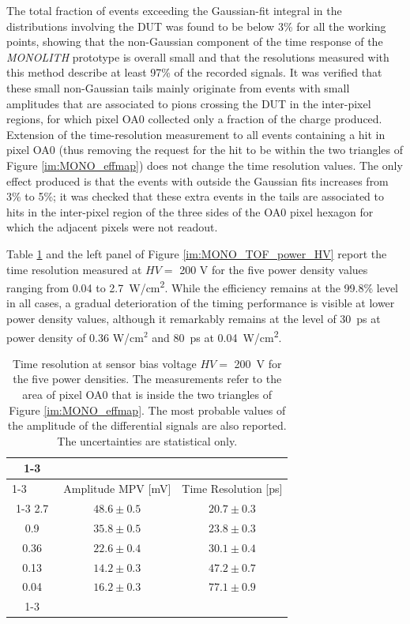 		The total fraction of events exceeding the Gaussian-fit integral in the \dtoa distributions involving the DUT was found to be below 3\% for all the working points, showing that the non-Gaussian component of the time response of the \textit{MONOLITH} prototype is overall small and that the resolutions measured with this method describe at least 97\% of the recorded signals. 
		It was verified that these small non-Gaussian tails mainly originate from events with small amplitudes that are associated to pions crossing the DUT in the inter-pixel regions, for which pixel OA0 collected only a fraction of the charge produced.
		Extension of the time-resolution measurement to all events containing a hit in pixel OA0 (thus removing the request for the hit to be within the two triangles of Figure \ref{im:MONO_effmap}) does not change the time resolution values. The only effect produced is that the events with \dtoa outside the Gaussian fits increases from 3\% to 5\%; it was checked that these extra events in the tails are associated to hits in the inter-pixel region of the three sides of the OA0 pixel hexagon for which the adjacent pixels were not readout.


		Table \ref{tab:MONO_tabsumm} and the left panel of Figure \ref{im:MONO_TOF_power_HV} report the time resolution measured at  $HV =$ 200 V for the five power density values ranging from 0.04 to \SI{2.7}{\watt/\centi\meter^2}. 
		While the efficiency remains at the 99.8\% level in all cases, a gradual deterioration of the timing performance is visible at lower power density values, although it remarkably remains at the level of \SI{30}{\pico\second} at power density of 0.36 W/cm$^2$ and \SI{80}{\pico\second} at \SI{0.04}{\watt/\centi\meter^2}. 

		\begin{table}[h]
			\centering
			\renewcommand{\arraystretch}{1.2}
			\begin{tabular}{|c|c|c|}
			\cline{1-3}
			\multicolumn{3}{|c|}{\textbf{DUT operated at  $ HV = \SI{200}{\volt} $ and $V_{\it th} = 7 \sigma_V$}} \\ 
			\cline{1-3}
			~~\power [W/cm$^2$]~~ & Amplitude MPV [mV] & Time Resolution [ps] \\
			\cline{1-3}
			2.7   & $ 48.6 \pm 0.5 $ &   $20.7 \pm 0.3$ \\
			0.9   & $ 35.8 \pm 0.5 $ &   $23.8 \pm 0.3$ \\
			0.36  & $ 22.6 \pm 0.4 $ &   $30.1 \pm 0.4$ \\
			0.13  & $ 14.2 \pm 0.3 $ &   $47.2 \pm 0.7$ \\
			0.04  & $ 16.2 \pm 0.3 $ &   $77.1 \pm 0.9$ \\
			\cline{1-3}
			\end{tabular}
			\caption{ Time resolution at sensor bias voltage $HV =$ \SI{200}{\volt} for the five power densities. The measurements refer to the area of pixel OA0 that is inside the two triangles of Figure \ref{im:MONO_effmap}. The most probable values of the amplitude of the differential signals are also reported. The uncertainties are statistical only.}
			\label{tab:MONO_tabsumm} 
		\end{table}

